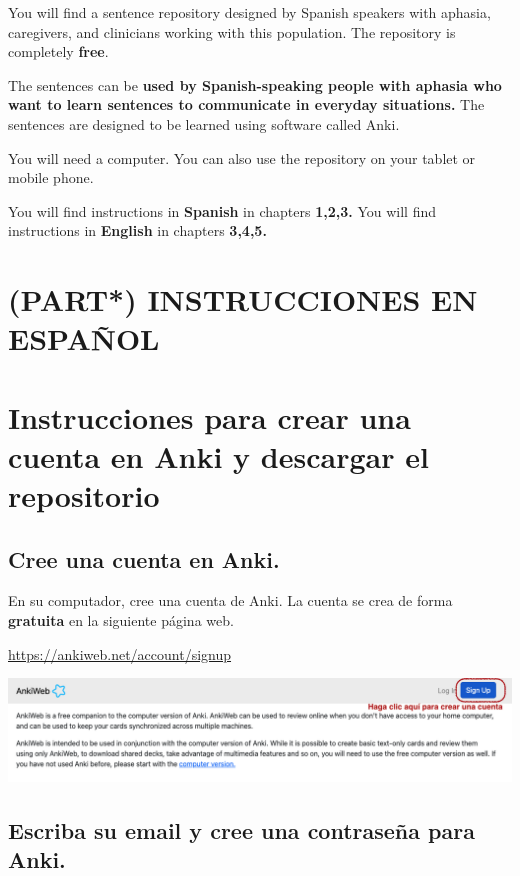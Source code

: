 \documentclass[
]{book}
\begin{document}
You will find a sentence repository designed by Spanish speakers with aphasia, caregivers, and clinicians working with this population. The repository is completely \textbf{free}.

The sentences can be \textbf{used by Spanish-speaking people with aphasia who want to learn sentences to communicate in everyday situations.} The sentences are designed to be learned using software called Anki.

You will need a computer. You can also use the repository on your tablet or mobile phone.

You will find instructions in \textbf{Spanish} in chapters \textbf{1,2,3.}
You will find instructions in \textbf{English} in chapters \textbf{3,4,5.}

\hypertarget{part-instrucciones-en-espauxf1ol}{%
\chapter*{\texorpdfstring{(PART*) \textbf{INSTRUCCIONES EN ESPAÑOL}}{(PART*) INSTRUCCIONES EN ESPAÑOL}}\label{part-instrucciones-en-espauxf1ol}}

\hypertarget{cross_0}{%
\chapter{Instrucciones para crear una cuenta en Anki y descargar el repositorio}\label{cross_0}}

\hypertarget{cree-una-cuenta-en-anki.}{%
\section{Cree una cuenta en Anki.}\label{cree-una-cuenta-en-anki.}}

En su computador, cree una cuenta de Anki. La cuenta se crea de forma \textbf{gratuita} en la siguiente página web.

\url{https://ankiweb.net/account/signup}

\includegraphics[width=0.9\linewidth]{images/reposit_sp/sign_up}

\hypertarget{cross_1}{%
\section{Escriba su email y cree una contraseña para Anki.}\label{cross_1}}
\end{document}
